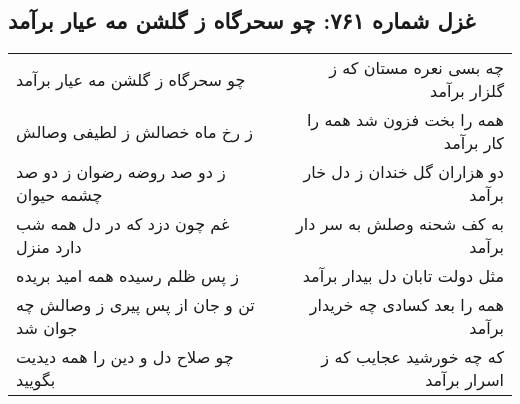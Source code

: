 \begin{center}
\section*{غزل شماره ۷۶۱: چو سحرگاه ز گلشن مه عیار برآمد}
\label{sec:0761}
\begin{longtable}{l p{0.5cm} r}
چو سحرگاه ز گلشن مه عیار برآمد
&&
چه بسی نعره مستان که ز گلزار برآمد
\\
ز رخ ماه خصالش ز لطیفی وصالش
&&
همه را بخت فزون شد همه را کار برآمد
\\
ز دو صد روضه رضوان ز دو صد چشمه حیوان
&&
دو هزاران گل خندان ز دل خار برآمد
\\
غم چون دزد که در دل همه شب دارد منزل
&&
به کف شحنه وصلش به سر دار برآمد
\\
ز پس ظلم رسیده همه امید بریده
&&
مثل دولت تابان دل بیدار برآمد
\\
تن و جان از پس پیری ز وصالش چه جوان شد
&&
همه را بعد کسادی چه خریدار برآمد
\\
چو صلاح دل و دین را همه دیدیت بگویید
&&
که چه خورشید عجایب که ز اسرار برآمد
\\
\end{longtable}
\end{center}
